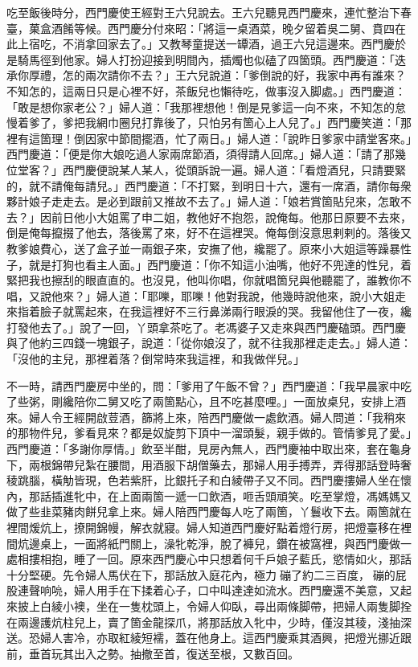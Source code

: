 吃至飯後時分，西門慶使王經對王六兒說去。王六兒聽見西門慶來，連忙整治下春臺，菓盒酒餚等候。西門慶分付來昭：「將這一桌酒菜，晚夕留着吳二舅、賁四在此上宿吃，不消拿回家去了。」又教琴童提送一罈酒，過王六兒這邊來。西門慶於是騎馬徑到他家。婦人打扮迎接到明間內，插燭也似磕了四箇頭。西門慶道：「迭承你厚禮，怎的兩次請你不去？」王六兒說道：「爹倒說的好，我家中再有誰來？不知怎的，這兩日只是心裡不好，茶飯兒也懶待吃，做事沒入脚處。」西門慶道：「敢是想你家老公？」婦人道：「我那裡想他！倒是見爹這一向不來，不知怎的怠慢着爹了，爹把我網巾圈兒打靠後了，只怕另有箇心上人兒了。」西門慶笑道：「那裡有這箇理！倒因家中節間擺酒，忙了兩日。」婦人道：「說昨日爹家中請堂客來。」西門慶道：「便是你大娘吃過人家兩席節酒，須得請人回席。」婦人道：「請了那幾位堂客？」西門慶便說某人某人，從頭訴說一遍。婦人道：「看燈酒兒，只請要緊的，就不請俺每請兒。」西門慶道：「不打緊，到明日十六，還有一席酒，請你每衆夥計娘子走走去。是必到跟前又推故不去了。」婦人道：「娘若賞箇貼兒來，怎敢不去？」{}因前日他小大姐罵了申二姐，教他好不抱怨，說俺每。他那日原要不去來，倒是俺每攛掇了他去，落後罵了來，好不在這裡哭。俺每倒沒意思剌剌的。落後又教爹娘費心，送了盒子並一兩銀子來，安撫了他，纔罷了。原來小大姐這等躁暴性子，就是打狗也看主人面。」西門慶道：「你不知這小油嘴，他好不兜達的性兒，着緊把我也擦刮的眼直直的。也沒見，他叫你唱，你就唱箇兒與他聽罷了，誰教你不唱，又說他來？」婦人道：「耶嚛，耶嚛！他對我說，他幾時說他來，說小大姐走來指着臉子就罵起來，在我這裡好不三行鼻涕兩行眼淚的哭。我留他住了一夜，纔打發他去了。」說了一回，丫頭拿茶吃了。老馮婆子又走來與西門慶磕頭。西門慶與了他約三四錢一塊銀子，說道：「從你娘沒了，就不往我那裡走走去。」婦人道：「沒他的主兒，那裡着落？倒常時來我這裡，和我做伴兒。」

不一時，請西門慶房中坐的，問：「爹用了午飯不曾？」西門慶道：「我早晨家中吃了些粥，剛纔陪你二舅又吃了兩箇點心，且不吃甚麼哩。」一面放桌兒，安排上酒來。婦人令王經開啟荳酒，篩將上來，陪西門慶做一處飲酒。婦人問道：「我稍來的那物件兒，爹看見來？都是奴旋剪下頂中一溜頭髮，親手做的。管情爹見了愛。」西門慶道：「多謝你厚情。」飲至半酣，見房內無人，西門慶袖中取出來，{}套在龜身下，兩根錦帶兒紮在腰間，用酒服下胡僧藥去，那婦人用手搏弄，弄得那話登時奢稜跳腦，橫觔皆現，色若紫肝，比銀托子和白綾帶子又不同。西門慶摟婦人坐在懷內，那話插進牝中，在上面兩箇一遞一口飲酒，咂舌頭頑笑。吃至掌燈，馮媽媽又做了些韭菜豬肉餅兒拿上來。婦人陪西門慶每人吃了兩箇，丫鬟收下去。兩箇就在裡間煖炕上，撩開錦幔，解衣就寢。婦人知道西門慶好點着燈行房，把燈臺移在裡間炕邊桌上，一面將紙門關上，澡牝乾淨，脫了褲兒，鑽在被窩裡，與西門慶做一處相摟相抱，睡了一回。{}原來西門慶心中只想着何千戶娘子藍氏，慾情如火，那話十分堅硬。先令婦人馬伏在下，那話放入庭花內，極力𢵞磞了約二三百度，𢵞磞的屁股連聲响喨，婦人用手在下揉着心子，口中叫達達如流水。西門慶還不美意，又起來披上白綾小襖，坐在一隻枕頭上，令婦人仰臥，尋出兩條脚帶，把婦人兩隻脚拴在兩邊護炕柱兒上，賣了箇金龍探爪，將那話放入牝中，少時，僅沒其稜，淺抽深送。恐婦人害冷，亦取紅綾短襦，蓋在他身上。這西門慶乘其酒興，把燈光挪近跟前，垂首玩其出入之勢。抽撤至首，復送至根，又數百回。

